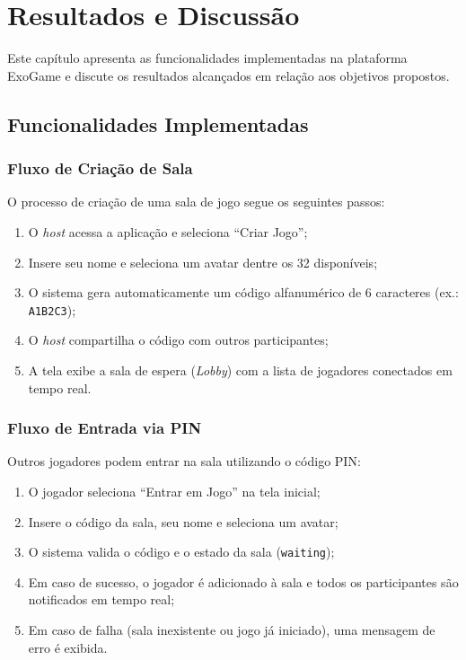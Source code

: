 \documentclass[
	12pt,
	openany,
	oneside,
	a4paper,
	english,
	brazil
]{abntex2}
\begin{document}
\chapter{Resultados e Discussão}\label{cap:resultados}

Este capítulo apresenta as funcionalidades implementadas na plataforma ExoGame e discute os resultados alcançados em relação aos objetivos propostos.

\section{Funcionalidades Implementadas}

\subsection{Fluxo de Criação de Sala}

O processo de criação de uma sala de jogo segue os seguintes passos:

\begin{enumerate}
  \item O \textit{host} acessa a aplicação e seleciona ``Criar Jogo'';
  \item Insere seu nome e seleciona um avatar dentre os 32 disponíveis;
  \item O sistema gera automaticamente um código alfanumérico de 6 caracteres (ex.: \texttt{A1B2C3});
  \item O \textit{host} compartilha o código com outros participantes;
  \item A tela exibe a sala de espera (\textit{Lobby}) com a lista de jogadores conectados em tempo real.
\end{enumerate}

\subsection{Fluxo de Entrada via PIN}

Outros jogadores podem entrar na sala utilizando o código PIN:

\begin{enumerate}
  \item O jogador seleciona ``Entrar em Jogo'' na tela inicial;
  \item Insere o código da sala, seu nome e seleciona um avatar;
  \item O sistema valida o código e o estado da sala (\texttt{waiting});
  \item Em caso de sucesso, o jogador é adicionado à sala e todos os participantes são notificados em tempo real;
  \item Em caso de falha (sala inexistente ou jogo já iniciado), uma mensagem de erro é exibida.
\end{enumerate}
\end{document}
